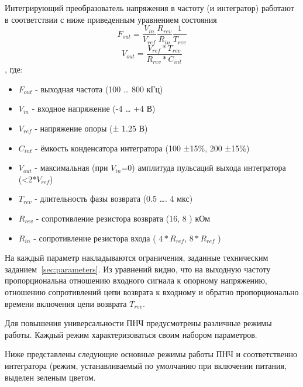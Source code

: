 \documentclass[a4paper,12pt,oneside]{scrartcl}
\begin{document}
Интегрирующий преобразователь напряжения в частоту (и интегратор) работают в соответствии с ниже приведенным уравнением состояния
$$F_{out} = \frac{V_{in}}{V_{ref}} \frac{R_{rev}}{R_{in}} \frac{1}{T_{rev}}$$
$$V_{out} = \frac{V_{ref} * T_{rev}}{R_{rev} * C_{int}}$$ , где:
\begin{itemize}
    \item $F_{out}$	- выходная частота                                    (100 … 800 кГц)
    \item $V_{in}$	- входное напряжение                               (-4 … +4 В)
    \item $V_{ref}$	- напряжение опоры                                  (± 1.25 В)
    \item $C_{int}$	- ёмкость конденсатора интегратора       (100 ±15\%,  200 ±15\%)
    \item $V_{out}$	- максимальная (при $V_{in}$=0) амплитуда пульсаций выхода интегратора (<2*$V_{ref}$)
    \item $T_{rev}$	- длительность фазы возврата                 (0.5 …. 4 мкс)
    \item $R_{rev}$	- сопротивление резистора возврата       (16,   8 )  кОм
    \item $R_{in}$	- сопротивление резистора входа             ( $4*R_{ref}$,  $8*R_{ref}$ )
\end{itemize}

На каждый параметр накладываются ограничения, заданные техническим заданием~\ref{sec:parameters}. Из уравнений видно, что на выходную частоту пропорциональна отношению входного сигнала к опорному напряжению, отношению сопротивлений цепи возврата к входному и обратно пропорционально времени включения цепи возврата $T_{rev}$. 

Для повышения универсальности ПНЧ предусмотрены различные режимы работы. Каждый режим характеризоваться своим набором параметров. 

Ниже представлены следующие основные режимы работы ПНЧ и соответственно интегратора (режим, устанавливаемый по умолчанию при включении питания, выделен зеленым цветом.
\end{document}
